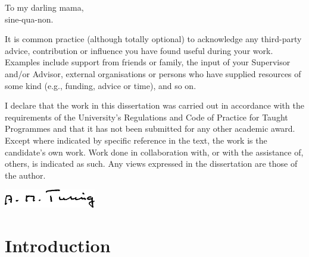 \documentclass[]{uob-thesis}
\begin{document}
\begin{dedication}  %
  To my darling mama,\\
  sine-qua-non.
\end{dedication}

\begin{acknowledgements}
It is common practice (although totally optional) to acknowledge any third-party
advice, contribution or influence you have found useful during your work.
Examples include support from friends or family, the input of your Supervisor
and/or Advisor, external organisations or persons who have supplied resources
of some kind (e.g., funding, advice or time), and so on.
\end{acknowledgements}

\begin{declaration}
  I declare that the work in this dissertation was carried out in accordance
  with the requirements of the University's Regulations and Code of Practice for
  Taught Programmes and that it has not been submitted for any other academic award.
  Except where indicated by specific reference in the text, the work is the
  candidate's own work. Work done in collaboration with, or with the assistance
  of, others, is indicated as such. Any views expressed in the
  dissertation are those of the author.
  
  \vspace{2cm}

  \includegraphics[width=4cm]{sig} %
\end{declaration}




\frontmatter

\tableofcontents
\listoftables
\listoffigures



\mainmatter

\chapter{Introduction}

  
\end{document}
